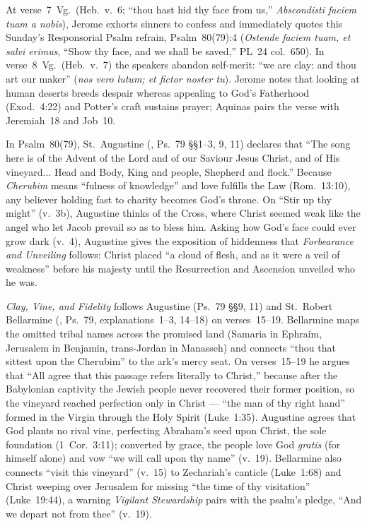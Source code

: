 At verse~7~Vg.\ (Heb.~v.~6; ``thou hast hid thy face from us,'' \emph{Abscondisti faciem tuam a nobis}), Jerome exhorts sinners to confess and immediately quotes this Sunday's Responsorial Psalm refrain, Psalm~80(79):4 (\emph{Ostende faciem tuam, et salvi erimus}, ``Show thy face, and we shall be saved,'' PL~24 col.~650). In verse~8~Vg.\ (Heb.~v.~7) the speakers abandon self-merit: ``we are clay: and thou art our maker'' (\emph{nos vero lutum; et fictor noster tu}). Jerome notes that looking at human deserts breeds despair whereas appealing to God's Fatherhood (Exod.~4:22) and Potter's craft sustains prayer; Aquinas pairs the verse with Jeremiah~18 and Job~10.

In Psalm~80(79), St.~Augustine (, Ps.~79 §§1--3, 9, 11) declares that ``The song here is of the Advent of the Lord and of our Saviour Jesus Christ, and of His vineyard... Head and Body, King and people, Shepherd and flock.'' Because \emph{Cherubim} means ``fulness of knowledge'' and love fulfills the Law (Rom.~13:10), any believer holding fast to charity becomes God's throne. On ``Stir up thy might'' (v.~3b), Augustine thinks of the Cross, where Christ seemed weak like the angel who let Jacob prevail so as to bless him. Asking how God's face could ever grow dark (v.~4), Augustine gives the exposition of hiddenness that \emph{Forbearance and Unveiling} follows: Christ placed ``a cloud of flesh, and as it were a veil of weakness'' before his majesty until the Resurrection and Ascension unveiled who he was.

\emph{Clay, Vine, and Fidelity} follows Augustine (Ps.~79 §§9, 11) and St.~Robert Bellarmine (, Ps.~79, explanations~1--3, 14--18) on verses~15--19. Bellarmine maps the omitted tribal names across the promised land (Samaria in Ephraim, Jerusalem in Benjamin, trans-Jordan in Manasseh) and connects ``thou that sittest upon the Cherubim'' to the ark's mercy seat. On verses~15--19 he argues that ``All agree that this passage refers literally to Christ,'' because after the Babylonian captivity the Jewish people never recovered their former position, so the vineyard reached perfection only in Christ --- ``the man of thy right hand'' formed in the Virgin through the Holy Spirit (Luke~1:35). Augustine agrees that God plants no rival vine, perfecting Abraham's seed upon Christ, the sole foundation (1~Cor.~3:11); converted by grace, the people love God \emph{gratis} (for himself alone) and vow ``we will call upon thy name'' (v.~19). Bellarmine also connects ``visit this vineyard'' (v.~15) to Zechariah's canticle (Luke~1:68) and Christ weeping over Jerusalem for missing ``the time of thy visitation'' (Luke~19:44), a warning \emph{Vigilant Stewardship} pairs with the psalm's pledge, ``And we depart not from thee'' (v.~19).

